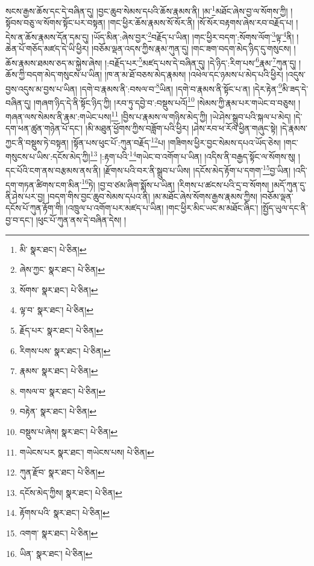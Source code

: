 སངས་རྒྱས་ཆོས་དང་དེ་བཞིན་དུ། །བྱང་ཆུབ་སེམས་དཔའི་ཆོས་རྣམས་ནི། །མ་\footnote{མི་  སྣར་ཐང་།  པེ་ཅིན། }མཐོང་ཞེས་བྱ་ལ་སོགས་ཀྱི། །སྟོབས་བཅུ་ལ་སོགས་སྟོང་པར་བསྟན། །གང་ཕྱིར་ཆོས་རྣམས་སོ་སོར་ནི། །སོ་སོར་བརྟགས་ཞེས་རབ་བརྗོད་པ། །དེས་ན་ཆོས་རྣམས་དོན་དམ་དུ། །ཡོད་མིན་:ཞེས་བྱར་\footnote{ཞེས་ཀྱང་  སྣར་ཐང་།  པེ་ཅིན། }བརྗོད་པ་ཡིན། །གང་ཕྱིར་བདག་:སོགས་ལོག་\footnote{སོགས་  སྣར་ཐང་།  པེ་ཅིན། }ལྟ་\footnote{ལྟ་བ་  སྣར་ཐང་།  པེ་ཅིན། }ནི། །ཆེན་པོ་གཅོད་མཛད་དེ་ཡི་ཕྱིར། །བཅོམ་ལྡན་འདས་ཀྱིས་རྣམ་ཀུན་དུ། །གང་ཟག་བདག་མེད་ཉིད་དུ་གསུངས། །ཆོས་རྣམས་ཐམས་ཅད་མ་སྐྱེས་ཞེས། །:བརྗོད་པར་\footnote{རྗོད་པར་  སྣར་ཐང་།  པེ་ཅིན། }མཛད་པས་དེ་བཞིན་དུ། །དེ་ཉིད་:རིག་པས་\footnote{རིགས་པས་  སྣར་ཐང་།  པེ་ཅིན། }རྣམ་\footnote{རྣམས་  སྣར་ཐང་།  པེ་ཅིན། }ཀུན་དུ། །ཆོས་ཀྱི་བདག་མེད་གསུངས་པ་ཡིན། །ཁ་ན་མ་ཐོ་བཅས་མེད་རྣམས། །འཕེལ་དང་ཉམས་པ་མེད་པའི་ཕྱིར། །འདུས་བྱས་འདུས་མ་བྱས་པ་ཡིན། །དགེ་བ་རྣམས་ནི་:བསལ་བ་\footnote{གསལ་བ་  སྣར་ཐང་།  པེ་ཅིན། }ཡིན། །དགེ་བ་རྣམས་ནི་སྟོང་པ་ན། །དེར་རྟེན་\footnote{བརྟེན་  སྣར་ཐང་།  པེ་ཅིན། }མི་ཟད་དེ་བཞིན་དུ། །གཞག་ཉིད་དེ་ནི་སྟོང་ཉིད་ཀྱི། །རབ་ཏུ་དབྱེ་བ་:བསྡུས་པའོ།\footnote{བསྡུས་པ་ཞེས།  སྣར་ཐང་།  པེ་ཅིན། } །སེམས་ཀྱི་རྣམ་པར་གཡེང་བ་བཅུས། །གཞན་ལས་སེམས་ནི་རྣམ་:གཡེང་པས།\footnote{གཡེངས་པར  སྣར་ཐང་། གཡེངས་པས།  པེ་ཅིན། } །བྱིས་པ་རྣམས་ལ་གཉིས་མེད་ཀྱི། །ཡེ་ཤེས་སྒྲུབ་པའི་སྐལ་པ་མེད། །དེ་དག་ཕན་ཚུན་གཉེན་པོ་དང་། །མི་མཐུན་ཕྱོགས་ཀྱིས་བཟློག་པའི་ཕྱིར། །ཤེས་རབ་ཕ་རོལ་ཕྱིན་གཞུང་སྟེ། །དེ་རྣམས་ཀྱང་ནི་བསྡུས་ཏེ་བསྟན། །སྟོན་པས་ཕུང་པོ་:ཀུན་བརྗོད་\footnote{ཀུན་རྫོབ་  སྣར་ཐང་།  པེ་ཅིན། }པ། །གཟིགས་ཕྱིར་བྱང་སེམས་དཔའ་ཡོད་ཅེས། །གང་གསུངས་པ་ཡིས་:དངོས་མེད་ཀྱི།\footnote{དངོས་མེད་ཀྱིས།  སྣར་ཐང་།  པེ་ཅིན། } །:རྟག་པའི་\footnote{རྟོགས་པའི་  སྣར་ཐང་།  པེ་ཅིན། }གཡེང་བ་འགོག་པ་ཡིན། །འདིས་ནི་བརྒྱད་སྟོང་ལ་སོགས་སུ། །དང་པོའི་ངག་ནས་བརྩམས་ནས་ནི། །རྫོགས་པའི་བར་ནི་སྒྲུབ་པ་ཡིས། །དངོས་མེད་རྟོག་པ་དགག་\footnote{འགག་  སྣར་ཐང་།  པེ་ཅིན། }བྱ་ཡིན། །འདི་དག་གཏན་ཚིགས་ངག་མིན་\footnote{ཡིན་  སྣར་ཐང་།  པེ་ཅིན། }ཏེ། །བྱ་བ་ཙམ་ཞིག་སྨོས་པ་ཡིན། །རིགས་པ་ཚངས་པའི་དྲ་བ་སོགས། །མདོ་ཀུན་དུ་ནི་ཤེས་པར་བྱ། །བདག་གིས་བྱང་ཆུབ་སེམས་དཔའ་ནི། །མ་མཐོང་ཞེས་སོགས་རྒྱས་རྣམས་ཀྱིས། །བཅོམ་ལྡན་དངོས་པོ་ཀུན་རྟོག་གི། །འཁྲུལ་པ་འགོག་པར་མཛད་པ་ཡིན། །གང་ཕྱིར་མིང་ཡང་མ་མཐོང་ཞིང་། །སྤྱོད་ཡུལ་དང་ནི་བྱ་བ་དང་། །ཕུང་པོ་ཀུན་ནས་དེ་བཞིན་དེས། །
